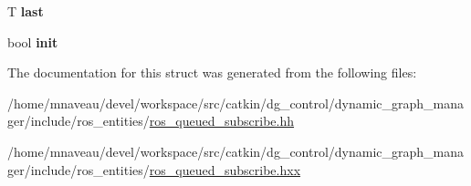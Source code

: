 \begin{DoxyCompactItemize}
\item 
T {\bfseries last}\hypertarget{structdynamic__graph_1_1internal_1_1BindedSignal_a23688c234ce0c8935ed3f52783fa9f2a}{}\label{structdynamic__graph_1_1internal_1_1BindedSignal_a23688c234ce0c8935ed3f52783fa9f2a}

\item 
bool {\bfseries init}\hypertarget{structdynamic__graph_1_1internal_1_1BindedSignal_ac2169fa9a731a30f66805c53af7f55eb}{}\label{structdynamic__graph_1_1internal_1_1BindedSignal_ac2169fa9a731a30f66805c53af7f55eb}

\end{DoxyCompactItemize}


The documentation for this struct was generated from the following files\+:\begin{DoxyCompactItemize}
\item 
/home/mnaveau/devel/workspace/src/catkin/dg\+\_\+control/dynamic\+\_\+graph\+\_\+manager/include/ros\+\_\+entities/\hyperlink{ros__queued__subscribe_8hh}{ros\+\_\+queued\+\_\+subscribe.\+hh}\item 
/home/mnaveau/devel/workspace/src/catkin/dg\+\_\+control/dynamic\+\_\+graph\+\_\+manager/include/ros\+\_\+entities/\hyperlink{ros__queued__subscribe_8hxx}{ros\+\_\+queued\+\_\+subscribe.\+hxx}\end{DoxyCompactItemize}
